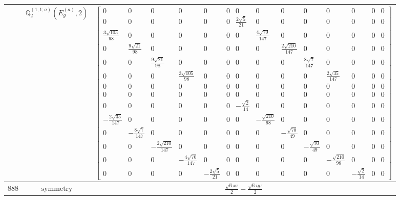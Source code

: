 \documentclass[fleqn,8pt,landscape]{jsarticle}
\begin{document}
\begin{longtable}{ccc}
$  $ & $ \mathbb{Q}_{2}^{(1,1;a)}(E_{g}^{(a)},2) $ & $ \begin{bmatrix} 0 & 0 & 0 & 0 & 0 & 0 & 0 & 0 & 0 & 0 & 0 & 0 & 0 & 0 \\ 0 & 0 & 0 & 0 & 0 & 0 & \frac{2 \sqrt{5}}{21} & 0 & 0 & 0 & 0 & 0 & 0 & 0 \\ \frac{3 \sqrt{105}}{98} & 0 & 0 & 0 & 0 & 0 & 0 & \frac{4 \sqrt{70}}{147} & 0 & 0 & 0 & 0 & 0 & 0 \\ 0 & \frac{9 \sqrt{21}}{98} & 0 & 0 & 0 & 0 & 0 & 0 & \frac{2 \sqrt{210}}{147} & 0 & 0 & 0 & 0 & 0 \\ 0 & 0 & \frac{9 \sqrt{21}}{98} & 0 & 0 & 0 & 0 & 0 & 0 & \frac{8 \sqrt{7}}{147} & 0 & 0 & 0 & 0 \\ 0 & 0 & 0 & \frac{3 \sqrt{105}}{98} & 0 & 0 & 0 & 0 & 0 & 0 & \frac{2 \sqrt{35}}{147} & 0 & 0 & 0 \\ 0 & 0 & 0 & 0 & 0 & 0 & 0 & 0 & 0 & 0 & 0 & 0 & 0 & 0 \\ 0 & 0 & 0 & 0 & 0 & 0 & 0 & 0 & 0 & 0 & 0 & 0 & 0 & 0 \\ 0 & 0 & 0 & 0 & 0 & 0 & - \frac{\sqrt{2}}{14} & 0 & 0 & 0 & 0 & 0 & 0 & 0 \\ - \frac{2 \sqrt{35}}{147} & 0 & 0 & 0 & 0 & 0 & 0 & - \frac{\sqrt{210}}{98} & 0 & 0 & 0 & 0 & 0 & 0 \\ 0 & - \frac{8 \sqrt{7}}{147} & 0 & 0 & 0 & 0 & 0 & 0 & - \frac{\sqrt{70}}{49} & 0 & 0 & 0 & 0 & 0 \\ 0 & 0 & - \frac{2 \sqrt{210}}{147} & 0 & 0 & 0 & 0 & 0 & 0 & - \frac{\sqrt{70}}{49} & 0 & 0 & 0 & 0 \\ 0 & 0 & 0 & - \frac{4 \sqrt{70}}{147} & 0 & 0 & 0 & 0 & 0 & 0 & - \frac{\sqrt{210}}{98} & 0 & 0 & 0 \\ 0 & 0 & 0 & 0 & - \frac{2 \sqrt{5}}{21} & 0 & 0 & 0 & 0 & 0 & 0 & - \frac{\sqrt{2}}{14} & 0 & 0 \end{bmatrix} $ \\ \hline
$ 888 $ & $ \text{symmetry} $ & $ \frac{\sqrt{6} x z}{2} - \frac{\sqrt{6} i y z}{2} $ \\

\end{longtable}
\end{document}
